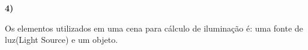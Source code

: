 \textbf{4)} 

Os elementos utilizados em uma cena para cálculo de iluminação é: 
uma fonte de luz(Light Source) e um objeto.

